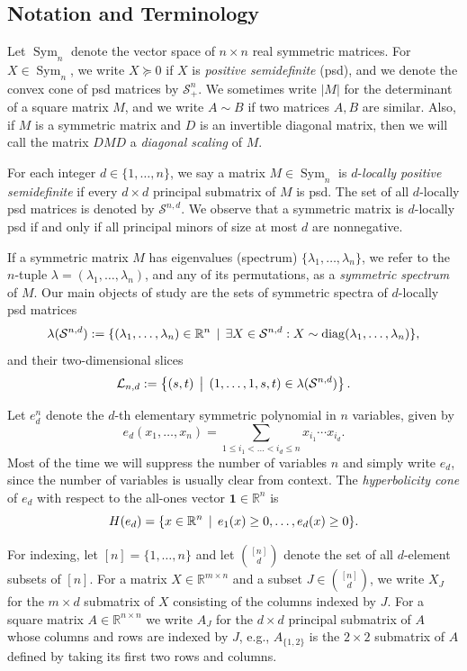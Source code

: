 \documentclass[reqno,hidelinks,11pt]{amsart}
\numberwithin{equation}{section}
\def\RR{\mathbb{R}}
\def\diag{\operatorname{diag}}
\def\S{\mathcal{S}}
\def\Sym{\operatorname{Sym}}
\newcommand{\suchthat}{\;\ifnum\currentgrouptype=16 \middle\fi|\;}
\begin{document}
\subsection{Notation and Terminology}

Let $\Sym_n$ denote the vector space of $n\times n$ real symmetric matrices. For $X\in \Sym_n$, we write $X\succeq 0$ if $X$ is \emph{positive semidefinite} (psd), and we denote the convex cone of psd matrices by $\S^n_+$. We sometimes write $|M|$ for the determinant of a square matrix $M$, and we write $A \sim B$ if two matrices $A,B$ are similar. Also, if $M$ is a symmetric matrix and $D$ is an invertible diagonal matrix, then we will call the matrix $DMD$ a \emph{diagonal scaling} of $M$.

For each integer $d \in \{1, \ldots, n\}$, we say a matrix $M\in\Sym_n$ is $d$-\emph{locally positive semidefinite} if every $d\times d$ principal submatrix of $M$ is psd. The set of all $d$-locally psd matrices is denoted by $\S^{n,d}$. We observe that a symmetric matrix is $d$-locally psd if and only if all principal minors of size at most $d$ are nonnegative.

If a symmetric matrix $M$ has eigenvalues (spectrum) $\{\lambda_1,\ldots,\lambda_n\}$, we refer to the $n$-tuple $\lambda = (\lambda_1,\ldots,\lambda_n)$, and any of its permutations, as a \emph{symmetric spectrum} of $M$.
Our main objects of study are the sets of symmetric spectra of $d$-locally psd matrices
\[\lambda(\S^{n,d}):=\{(\lambda_1,\dots,\lambda_n)\in\RR^n\, \suchthat \,\exists X\in\S^{n,d}:X\sim\diag(\lambda_1,\dots,\lambda_n)\},\]
and their two-dimensional slices
\[
\mathcal{L}_{n, d}:= \left\{(s, t)\,\suchthat\,(1, \ldots, 1, s, t) \in \lambda(\S^{n, d})\right\}.
\]

Let $e_d^n$ denote the $d$-th elementary symmetric polynomial in $n$ variables, given by
\[ e_d(x_1,\ldots,x_n) = \sum_{1 \leq i_1 < \ldots < i_d \leq n} x_{i_1}\cdots x_{i_d} .
\]
Most of the time we will suppress the number of variables $n$ and simply write $e_d$, since the number of variables is usually clear from context.
The \emph{hyperbolicity cone} of $e_d$ with respect to the all-ones vector $\mathbf{1} \in \RR^n$ is
\[
H(e_d)=\{x\in\RR^n\,\suchthat\, e_1(x)\ge0,\dots,e_d(x)\ge0\}.
\]

For indexing, let $[n]=\{1,\ldots,n\}$ and let $\binom{[n]}{d}$ denote the set of all $d$-element subsets of $[n]$. For a matrix $X \in \RR^{m \times n}$ and a subset $J \in \binom{[n]}{d}$, we write $X_J$ for the $m \times d$ submatrix of $X$ consisting of the columns indexed by $J$. For a square matrix $A \in \RR^{n \times n}$ we write $A_J$ for the $d \times d$ principal submatrix of $A$ whose columns and rows are indexed by $J$, e.g., $A_{\{1,2\}}$ is the $2\times 2$ submatrix of $A$ defined by taking its first two rows and columns.
\end{document}
